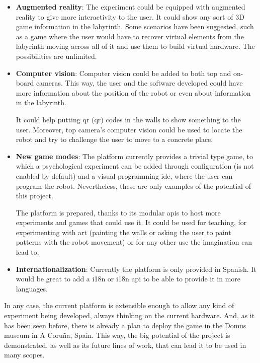 \begin{itemize}

	\item \textbf{Augmented reality}: The experiment could be equipped with augmented reality to
	give more interactivity to the user. It could show any sort of 3D game information in the
	labyrinth. Some scenarios have been suggested, such as a game where the user would have to
	recover virtual elements from the labyrinth moving across all of it and use them to build
	virtual hardware. The possibilities are unlimited.

	\item \textbf{Computer vision}: Computer vision could be added to both top and on-board cameras.
	This way, the user and the software developed could have more information about the position of
	the robot or even about information in the labyrinth.

	It could help putting \acrshort{qr}  (\acrlong{qr}) codes in the walls to show something to the
	user. Moreover, top camera's computer vision could be used to locate the robot and try to
	challenge the user to move to a concrete place.

	\item \textbf{New game modes}: The platform currently provides a trivial type game, to which a
	psychological experiment can be added through configuration (is not enabled by default) and a
	visual programming \acrshort{ide}, where the user can program the robot. Nevertheless, these are
	only examples of the potential of this project.

	The platform is prepared, thanks to its modular \acrshort{api}s to host more experiments and
	games that could use it. It could be used for teaching, for experimenting with art (painting the
	walls or asking the user to paint patterns with the robot movement) or for any other use the
	imagination can lead to.

	\item \textbf{Internationalization}: Currently the platform is only provided in Spanish. It
	would be great to add a \acrlong{i18n} or \acrshort{i18n} \acrshort{api} to be able to provide
	it in more languages.

\end{itemize}

In any case, the current platform is extensible enough to allow any kind of experiment being
developed, always thinking on the current hardware. And, as it has been seen before, there is
already a plan to deploy the game in the Domus museum in A Coruña, Spain. This way, the big
potential of the project is demonstrated, as well as its future lines of work, that can lead it to
be used in many scopes.
